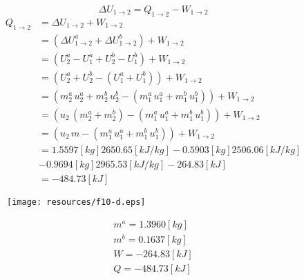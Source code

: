 \documentclass[letter,11pt]{article}
\begin{document}
\begin{enumerate}
\begin{equation*}
    \Delta U_{1\rightarrow 2} = Q_{1\rightarrow 2} - W_{1\rightarrow 2}
\end{equation*}
\begin{equation*}
    \begin{split}
        Q_{1\rightarrow 2} &= \Delta U_{1\rightarrow 2} + W_{1\rightarrow 2} \\
                           &= (\Delta U^a_{1\rightarrow 2} 
                              + \Delta U^b_{1\rightarrow 2})
                              + W_{1\rightarrow 2} \\
                           &= (U_2^a - U_1^a + U_2^b - U_1^b)
                              + W_{1\rightarrow 2} \\
                           &= (U_2^a+U_2^b - (U_1^a+U_1^b))
                              + W_{1\rightarrow 2} \\
                           &= (m_2^a\,u_2^a+m_2^b\,u_2^b
                              - (m_1^a\,u_1^a+m_1^b\,u_1^b))
                              + W_{1\rightarrow 2} \\
                           &= (u_2\,(m_2^a+m_2^b)
                              - (m_1^a\,u_1^a+m_1^b\,u_1^b))
                              + W_{1\rightarrow 2} \\
                           &= (u_2\,m-(m_1^a\,u_1^a+m_1^b\,u_1^b))
                              + W_{1\rightarrow 2} \\
                           &= 1.5597[kg]2650.65[kJ/kg]
                              - 0.5903[kg]2506.06[kJ/kg] \\
                           &- 0.9694[kg]2965.53[kJ/kg]-264.83[kJ] \\
                           &= -484.73[kJ]
    \end{split}
\end{equation*}

\begin{figure}[H]
\centering
\texttt{[image: resources/f10-d.eps]}
\end{figure}

\begin{equation*}
\boxed{
    \begin{array}{l}
        m^a = 1.3960[kg] \\
        m^b = 0.1637[kg] \\
        W = -264.83[kJ] \\
        Q = -484.73[kJ]
    \end{array}
}
\end{equation*}
\newpage


\end{enumerate}
\end{document}
